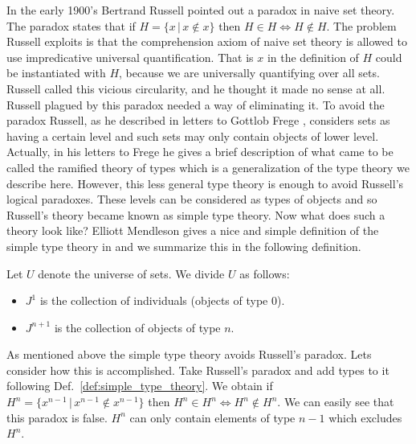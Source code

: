 In the early 1900's Bertrand Russell pointed out a paradox in naive
set theory.  The paradox states that if $H = \{ x\,|\,x \not \in x \}$
then $H \in H \iff H \not \in H$.  The problem Russell exploits is
that the comprehension axiom of naive set theory is allowed to use
impredicative universal quantification. That is $x$ in the definition
of $H$ could be instantiated with $H$, because we are universally
quantifying over all sets.  Russell called this vicious circularity,
and he thought it made no sense at all. Russell plagued by this
paradox needed a way of eliminating it.  To avoid the paradox Russell,
as he described in letters to Gottlob Frege \cite{Hintikka:1995,
  Heijenoort:1967}, considers sets as having a certain level and such
sets may only contain objects of lower level.  Actually, in his
letters to Frege he gives a brief description of what came to be
called the ramified theory of types which is a generalization of the
type theory we describe here.  However, this less general type theory
is enough to avoid Russell's logical paradoxes.  These levels can be
considered as types of objects and so Russell's theory became known as
simple type theory.  Now what does such a theory look like?  Elliott
Mendleson gives a nice and simple definition of the simple type theory
in \cite{Mendelson:2009} and we summarize this in the following
definition.
\begin{definition}
  \label{def:simple_type_theory}
  Let $U$ denote the universe of sets. We divide $U$ as follows:
  \begin{itemize}
  \item $J^1$ is the collection of individuals (objects of type $0$).
  \item $J^{n+1}$ is the collection of objects of type $n$.
  \end{itemize}
\end{definition}
As mentioned above the simple type theory avoids Russell's paradox.
Lets consider how this is accomplished.  Take Russell's paradox
and add types to it following Def.~\ref{def:simple_type_theory}.  We
obtain if $H^n = \{ x^{n-1}\,|\,x^{n-1} \not \in x^{n-1} \}$ then $H^n
\in H^n \iff H^n \not \in H^n$.  We can easily see that this paradox is
false.  $H^n$ can only contain elements of type $n-1$ which excludes
$H^n$.


